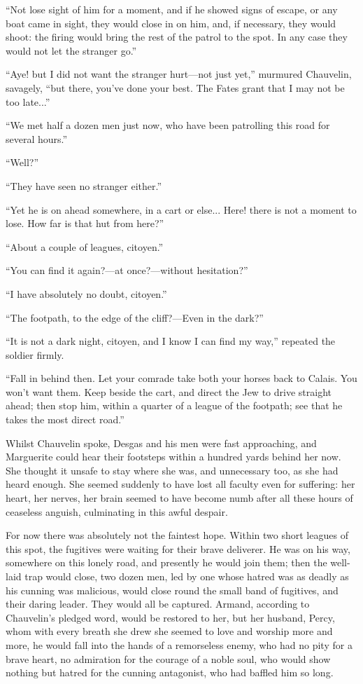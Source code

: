 \enquote{Not lose sight of him for a moment, and if he showed signs of escape, or any boat came in sight, they would close in on him, and, if necessary, they would shoot: the firing would bring the rest of the patrol to the spot. In any case they would not let the stranger go.}

\enquote{Aye! but I did not want the stranger hurt---not just yet,} murmured Chauvelin, savagely, \enquote{but there, you've done your best. The Fates grant that I may not be too late...}

\enquote{We met half a dozen men just now, who have been patrolling this road for several hours.}

\enquote{Well?}

\enquote{They have seen no stranger either.}

\enquote{Yet he is on ahead somewhere, in a cart or else... Here! there is not a moment to lose. How far is that hut from here?}

\enquote{About a couple of leagues, citoyen.}

\enquote{You can find it again?---at once?---without hesitation?}

\enquote{I have absolutely no doubt, citoyen.}

\enquote{The footpath, to the edge of the cliff?---Even in the dark?}

\enquote{It is not a dark night, citoyen, and I know I can find my way,} repeated the soldier firmly.

\enquote{Fall in behind then. Let your comrade take both your horses back to Calais. You won't want them. Keep beside the cart, and direct the Jew to drive straight ahead; then stop him, within a quarter of a league of the footpath; see that he takes the most direct road.}

Whilst Chauvelin spoke, Desgas and his men were fast approaching, and Marguerite could hear their footsteps within a hundred yards behind her now. She thought it unsafe to stay where she was, and unnecessary too, as she had heard enough. She seemed suddenly to have lost all faculty even for suffering: her heart, her nerves, her brain seemed to have become numb after all these hours of ceaseless anguish, culminating in this awful despair.

For now there was absolutely not the faintest hope. Within two short leagues of this spot, the fugitives were waiting for their brave deliverer. He was on his way, somewhere on this lonely road, and presently he would join them; then the well-laid trap would close, two dozen men, led by one whose hatred was as deadly as his cunning was malicious, would close round the small band of fugitives, and their daring leader. They would all be captured. Armand, according to Chauvelin's pledged word, would be restored to her, but her husband, Percy, whom with every breath she drew she seemed to love and worship more and more, he would fall into the hands of a remorseless enemy, who had no pity for a brave heart, no admiration for the courage of a noble soul, who would show nothing but hatred for the cunning antagonist, who had baffled him so long.

